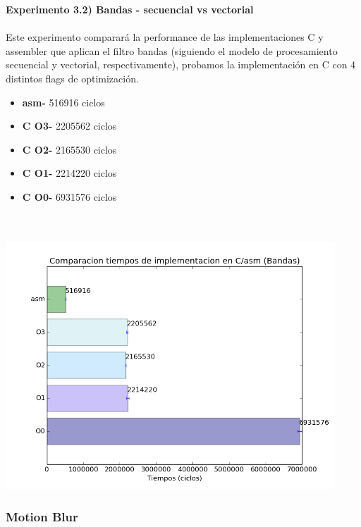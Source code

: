 \documentclass[a4paper]{article}
\begin{document}
\newpage

\textbf{Experimento 3.2) Bandas - secuencial vs vectorial}\\ \\

Este experimento comparar\'{a} la performance de las implementaciones C y assembler que aplican el filtro bandas (siguiendo el modelo de procesamiento secuencial y vectorial, respectivamente), probamos la implementaci\'{o}n en C con 4 distintos flags de optimizaci\'{o}n.

\begin{itemize}

\item \textbf{asm-}  516916 ciclos\\
\item \textbf{C O3-} 2205562 ciclos\\
\item \textbf{C O2-} 2165530 ciclos\\
\item \textbf{C O1-} 2214220 ciclos\\
\item \textbf{C O0-} 6931576 ciclos\\ \\ \\

\end{itemize}

\includegraphics[width=350pt]{imagenes/CompCasm3.png}

\newpage

\subsubsection{Motion Blur}
\end{document}
